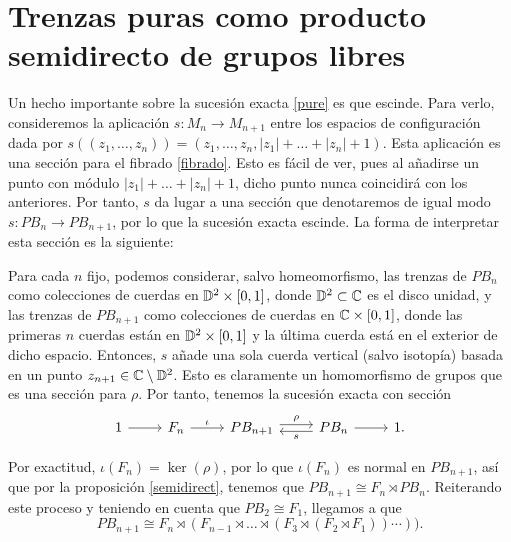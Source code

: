 \documentclass[TFG.tex]{subfiles}
\begin{document}



\newpage

\section{Trenzas puras como producto semidirecto de grupos libres}


Un hecho importante sobre la sucesión exacta \ref{pure} es que escinde. Para verlo, consideremos la aplicación $s:M_n\to M_{n+1}$ entre los espacios de configuración dada por $s((z_1,\dots,z_n))=(z_1,\dots,z_n,|z_1|+\dots+|z_n|+1)$. Esta aplicación es una sección para el fibrado \ref{fibrado}. Esto es fácil de ver, pues al añadirse un punto con módulo $|z_1|+\dots+|z_n|+1$, dicho punto nunca coincidirá con los anteriores. Por tanto, $s$ da lugar a una sección que denotaremos de igual modo $s:PB_n\to PB_{n+1}$, por lo que la sucesión exacta escinde. La forma de interpretar esta sección es la siguiente:

Para cada $n$ fijo, podemos considerar, salvo homeomorfismo, las trenzas de $PB_n$ como colecciones de cuerdas en $\mathbb{D}^2\times[0,1]$, donde $\mathbb{D}^2\subset\mathbb{C}$ es el disco unidad, y las trenzas de $PB_{n+1}$ como colecciones de cuerdas en $\mathbb{C}\times[0,1]$, donde las primeras $n$ cuerdas están en $\mathbb{D}^2\times[0,1]$ y la última cuerda está en el exterior de dicho espacio. Entonces, $s$ añade una sola cuerda vertical (salvo isotopía) basada en un punto $z_{n+1}\in\mathbb{C}\setminus\mathbb{D}^2$. Esto es claramente un homomorfismo de grupos que es una sección para $\rho$. Por tanto, tenemos la sucesión exacta con sección
\[
\begin{tikzcd}
1\arrow[r]& F_n\arrow[r, "\iota"] & PB_{n+1}\arrow[r,"\rho", shift left]& \arrow[l,"s",shift left]PB_n\arrow[r] & 1.
\end{tikzcd}
\]

Por exactitud, $\iota(F_n)=\ker(\rho)$, por lo que $\iota(F_n)$ es normal en $PB_{n+1}$, así que por la proposición \ref{semidirect}, tenemos que $PB_{n+1}\cong F_n\rtimes PB_n$. Reiterando este proceso y teniendo en cuenta que $PB_2\cong F_1$, llegamos a que 
$$PB_{n+1}\cong F_n\rtimes (F_{n-1} \rtimes\dots\rtimes (F_3\rtimes (F_2\rtimes F_1))\cdots)).$$
\end{document}
